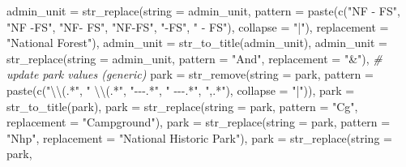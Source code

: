 \documentclass[
  11 pt,
  openany]{book}
\newenvironment{Shaded}{\begin{snugshade}}{\end{snugshade}}
\newcommand{\AttributeTok}[1]{\textcolor[rgb]{0.77,0.63,0.00}{#1}}
\newcommand{\CommentTok}[1]{\textcolor[rgb]{0.56,0.35,0.01}{\textit{#1}}}
\newcommand{\FunctionTok}[1]{\textcolor[rgb]{0.00,0.00,0.00}{#1}}
\newcommand{\NormalTok}[1]{#1}
\newcommand{\SpecialCharTok}[1]{\textcolor[rgb]{0.00,0.00,0.00}{#1}}
\newcommand{\StringTok}[1]{\textcolor[rgb]{0.31,0.60,0.02}{#1}}
\begin{document}
\begin{Shaded}
\begin{Highlighting}[]
    \AttributeTok{admin\_unit =} \FunctionTok{str\_replace}\NormalTok{(}\AttributeTok{string =}\NormalTok{ admin\_unit,}
                             \AttributeTok{pattern =} \FunctionTok{paste}\NormalTok{(}\FunctionTok{c}\NormalTok{(}\StringTok{"NF {-} FS"}\NormalTok{, }\StringTok{"NF {-}FS"}\NormalTok{, }
                                               \StringTok{"NF{-} FS"}\NormalTok{, }\StringTok{"NF{-}FS"}\NormalTok{, }
                                               \StringTok{"{-}FS"}\NormalTok{, }\StringTok{" {-} FS"}\NormalTok{), }
                                             \AttributeTok{collapse =} \StringTok{"|"}\NormalTok{),}
                             \AttributeTok{replacement =} \StringTok{"National Forest"}\NormalTok{),}
    \AttributeTok{admin\_unit =} \FunctionTok{str\_to\_title}\NormalTok{(admin\_unit),}
    \AttributeTok{admin\_unit =} \FunctionTok{str\_replace}\NormalTok{(}\AttributeTok{string =}\NormalTok{ admin\_unit,}
                             \AttributeTok{pattern =} \StringTok{"And"}\NormalTok{,}
                             \AttributeTok{replacement =} \StringTok{"\&"}\NormalTok{),}
    \CommentTok{\# update park values (generic)}
    \AttributeTok{park =} \FunctionTok{str\_remove}\NormalTok{(}\AttributeTok{string =}\NormalTok{ park,}
                      \AttributeTok{pattern =} \FunctionTok{paste}\NormalTok{(}\FunctionTok{c}\NormalTok{(}\StringTok{"}\SpecialCharTok{\textbackslash{}\textbackslash{}}\StringTok{(.*"}\NormalTok{, }\StringTok{" }\SpecialCharTok{\textbackslash{}\textbackslash{}}\StringTok{(.*"}\NormalTok{,}
                                        \StringTok{"{-}{-}{-}.*"}\NormalTok{, }\StringTok{" {-}{-}{-}.*"}\NormalTok{,}
                                        \StringTok{",.*"}\NormalTok{), }
                                      \AttributeTok{collapse =} \StringTok{"|"}\NormalTok{)),}
    \AttributeTok{park =} \FunctionTok{str\_to\_title}\NormalTok{(park),}
    \AttributeTok{park =} \FunctionTok{str\_replace}\NormalTok{(}\AttributeTok{string =}\NormalTok{ park,}
                       \AttributeTok{pattern =} \StringTok{"Cg"}\NormalTok{,}
                       \AttributeTok{replacement =} \StringTok{"Campground"}\NormalTok{),}
    \AttributeTok{park =} \FunctionTok{str\_replace}\NormalTok{(}\AttributeTok{string =}\NormalTok{ park,}
                       \AttributeTok{pattern =} \StringTok{"Nhp"}\NormalTok{,}
                       \AttributeTok{replacement =} \StringTok{"National Historic Park"}\NormalTok{),}
    \AttributeTok{park =} \FunctionTok{str\_replace}\NormalTok{(}\AttributeTok{string =}\NormalTok{ park,}

\end{Highlighting}
\end{Shaded}
\end{document}
